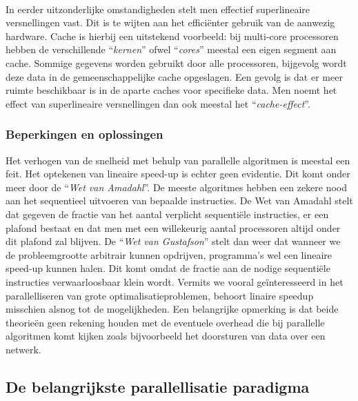 \paragraph{}
In eerder uitzonderlijke omstandigheden stelt men effectief superlineaire versnellingen vast. Dit is te wijten aan het effici\"enter gebruik van de aanwezig hardware. Cache is hierbij een uitstekend voorbeeld: bij multi-core processoren hebben de verschillende ``\emph{kernen}'' ofwel ``\emph{cores}'' meestal een eigen segment aan cache. Sommige gegevens worden gebruikt door alle processoren, bijgevolg wordt deze data in de gemeenschappelijke cache opgeslagen. Een gevolg is dat er meer ruimte beschikbaar is in de aparte caches voor specifieke data. Men noemt het effect van superlineaire versnellingen dan ook meestal het ``\emph{cache-effect}''\cite{cacheEffect}.

\subsubsection{Beperkingen en oplossingen}

Het verhogen van de snelheid met behulp van parallelle algoritmen is meestal een feit. Het optekenen van lineaire speed-up is echter geen evidentie. Dit komt onder meer door de ``\emph{Wet van Amadahl}''\cite{Amdahl:1967:VSP:1465482.1465560}. De meeste algoritmes hebben een zekere nood aan het sequentieel uitvoeren van bepaalde instructies. De Wet van Amadahl stelt dat gegeven de fractie van het aantal verplicht sequenti\"ele instructies, er een plafond bestaat en dat men met een willekeurig aantal processoren altijd onder dit plafond zal blijven. De ``\emph{Wet van Gustafson}''\cite{Gustafson:1988:RAL:42411.42415} stelt dan weer dat wanneer we de probleemgrootte arbitrair kunnen opdrijven, programma's wel een lineaire speed-up kunnen halen. Dit komt omdat de fractie aan de nodige sequenti\"ele instructies verwaarloosbaar klein wordt. Vermits we vooral ge\"interesseerd in het parallelliseren van grote optimalisatieproblemen, behoort linaire speedup misschien alsnog tot de mogelijkheden. Een belangrijke opmerking is dat beide theorie\"en geen rekening houden met de eventuele overhead die bij parallelle algoritmen komt kijken zoals bijvoorbeeld het doorsturen van data over een netwerk.

\subsection{De belangrijkste parallellisatie paradigma}


